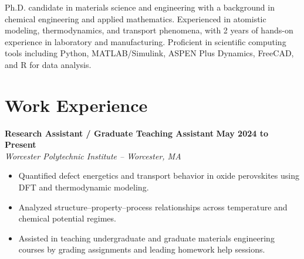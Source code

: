 \documentclass{article}
\begin{document}
Ph.D. candidate in materials science and engineering with a background in chemical engineering and applied mathematics. Experienced in atomistic modeling, thermodynamics, and transport phenomena, with 2 years of hands-on experience in laboratory and manufacturing. Proficient in scientific computing tools including Python, MATLAB/Simulink, ASPEN Plus Dynamics, FreeCAD, and R for data analysis.  




\section{Work Experience}

\textbf{Research Assistant / Graduate Teaching Assistant} \hfill \textbf{May 2024 to Present} \\
\textit{Worcester Polytechnic Institute -- Worcester, MA}\\[2pt]
\begin{itemize}
  \item Quantified defect energetics and transport behavior in oxide perovskites using DFT and thermodynamic modeling.
  \item Analyzed structure--property--process relationships across temperature and chemical potential regimes.
  \item Assisted in teaching undergraduate and graduate materials engineering courses by grading assignments and leading homework help sessions.
\end{itemize}
\end{document}
